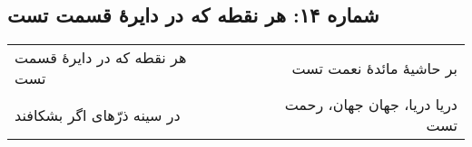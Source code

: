 \begin{center}
\section*{شماره ۱۴: هر نقطه که در دایرۀ قسمت تست}
\label{sec:014}
\begin{longtable}{l p{0.5cm} r}
هر نقطه که در دایرهٔ قسمت تست
&&
بر حاشیهٔ مائدهٔ نعمت تست
\\
در سینه ذرّهای اگر بشکافند
&&
دریا دریا، جهان جهان، رحمت تست
\\
\end{longtable}
\end{center}
